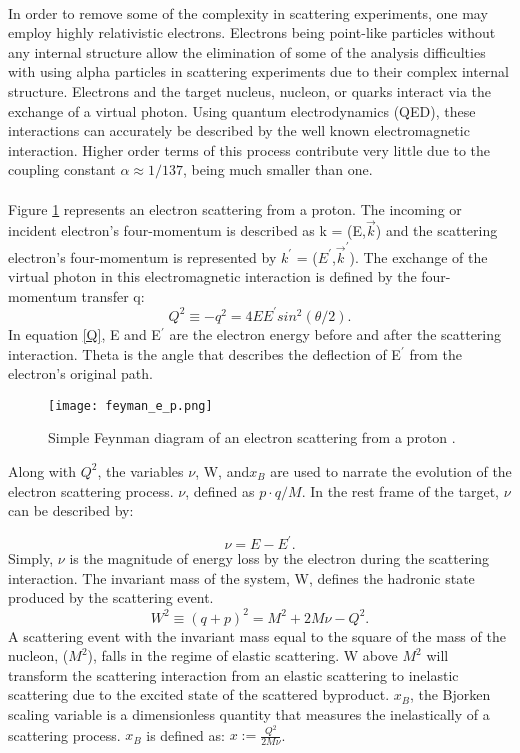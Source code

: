 \paragraph{} In order to remove some of the complexity in scattering experiments, one may employ highly relativistic electrons. Electrons being point-like particles without any internal structure allow the elimination of some of the analysis difficulties with using alpha particles in scattering experiments due to their complex internal structure. Electrons and the target nucleus, nucleon, or quarks interact via the exchange of a virtual photon. Using quantum electrodynamics (QED), these interactions can accurately be described by the well known electromagnetic interaction. Higher order terms of this process contribute very little due to the coupling constant $\alpha \approx 1/137 $, being much smaller than one. 
\paragraph{} Figure \ref{feynman} represents an electron scattering from a proton. The incoming or incident electron's four-momentum is described as k = (E,$ \vec{k}$) and the scattering electron's four-momentum is represented by $k^\prime{}$ = ($E^\prime{}$,$\vec{k}^\prime{}$). The exchange of the virtual photon in this electromagnetic interaction is defined by the four-momentum transfer q: 
\begin{equation}
\label{Q}
Q^2 \equiv -q^2 = 4EE^\prime{} sin^2(\theta/2).
\end{equation} 
In equation \ref{Q}, E and E$^\prime$ are the electron energy before and after the scattering interaction. Theta is the angle that describes the deflection of E$^\prime$ from the electron's original path. 

\begin{figure}[h]
\centering
\caption{Simple Feynman diagram of an electron scattering from a proton \cite{Flay}.}
\texttt{[image: feyman\_e\_p.png]}
\label{feynman}
\end{figure}
Along with $Q^2$, the variables $\nu$, W, and$x_B$  are used to narrate the evolution of the electron scattering process. $\nu$, defined as $p\cdot q/M$. In the rest frame of the target,  $\nu$ can be described by:

\begin{equation}
\label{v}
\nu = E - E^\prime{}.
\end{equation}
Simply, $\nu$ is the magnitude of energy loss by the electron during the scattering interaction. The invariant mass of the system, W,  defines the hadronic state produced by the scattering event. 
\begin{equation}
\label{W}
W^2 \equiv (q + p)^2 = M^2 + 2M\nu -Q^2.
\end{equation}
A scattering event with the invariant mass equal to the square of the mass of the nucleon, ($M^2$), falls in the regime of elastic scattering. W above $M^2$ will transform the scattering interaction from an elastic scattering to inelastic scattering due to the excited state of the scattered byproduct. $x_B$, the Bjorken scaling variable is a dimensionless quantity that measures the inelastically of a scattering process. $x_B$ is defined as: $x := \frac{Q^2}{2M\nu}$.
